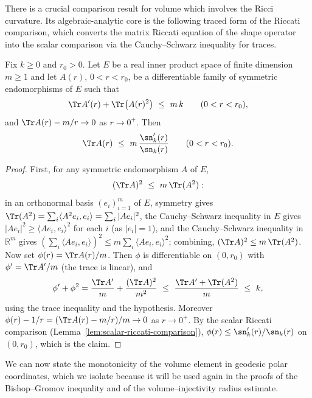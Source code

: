 There is a crucial comparison result for volume which involves the
Ricci curvature. Its algebraic-analytic core is the following traced
form of the Riccati comparison, which converts the matrix Riccati
equation of the shape operator into the scalar comparison via the
Cauchy--Schwarz inequality for traces.

\begin{lemma}
\label{lem:trace-riccati-comparison}
\leanok



Fix $k\ge0$ and $r_0>0$. Let $E$ be a real inner product space of
finite dimension $m\ge1$ and let $A(r)$, $0<r<r_0$, be a
differentiable family of symmetric endomorphisms of $E$ such that
$$\Tr A'(r)+\Tr\!\left(A(r)^2\right)\ \le\ m\,k
\qquad(0<r<r_0),$$
and $\Tr A(r)-m/r\to0$ as $r\to0^+$. Then
$$\Tr A(r)\ \le\ m\,\frac{\sn_k'(r)}{\sn_k(r)}\qquad(0<r<r_0).$$
\end{lemma}

\begin{proof}
\sketch
{}
\leanok
First, for any symmetric endomorphism $A$ of $E$,
$$(\Tr A)^2\ \le\ m\,\Tr(A^2):$$
in an orthonormal basis $(e_i)_{i=1}^m$ of $E$, symmetry gives
$\Tr(A^2)=\sum_i\langle A^2e_i,e_i\rangle=\sum_i|Ae_i|^2$, the
Cauchy--Schwarz inequality in $E$ gives
$|Ae_i|^2\ge\langle Ae_i,e_i\rangle^2$ for each $i$ (as $|e_i|=1$),
and the Cauchy--Schwarz inequality in $\mathbb{R}^m$ gives
$\left(\sum_i\langle Ae_i,e_i\rangle\right)^2
\le m\sum_i\langle Ae_i,e_i\rangle^2$; combining,
$(\Tr A)^2\le m\,\Tr(A^2)$. Now set $\phi(r)=\Tr A(r)/m$. Then
$\phi$ is differentiable on $(0,r_0)$ with $\phi'=\Tr A'/m$ (the
trace is linear), and
$$\phi'+\phi^2=\frac{\Tr A'}{m}+\frac{(\Tr A)^2}{m^2}
\ \le\ \frac{\Tr A'+\Tr(A^2)}{m}\ \le\ k,$$
using the trace inequality and the hypothesis. Moreover
$\phi(r)-1/r=(\Tr A(r)-m/r)/m\to0$ as $r\to0^+$. By the scalar
Riccati comparison (Lemma~\ref{lem:scalar-riccati-comparison}),
$\phi(r)\le\sn_k'(r)/\sn_k(r)$ on $(0,r_0)$, which is the claim.
\end{proof}

We can now state the monotonicity of the volume element in geodesic
polar coordinates, which we isolate because it will be used again in
the proofs of the Bishop--Gromov inequality and of the
volume--injectivity radius estimate.

